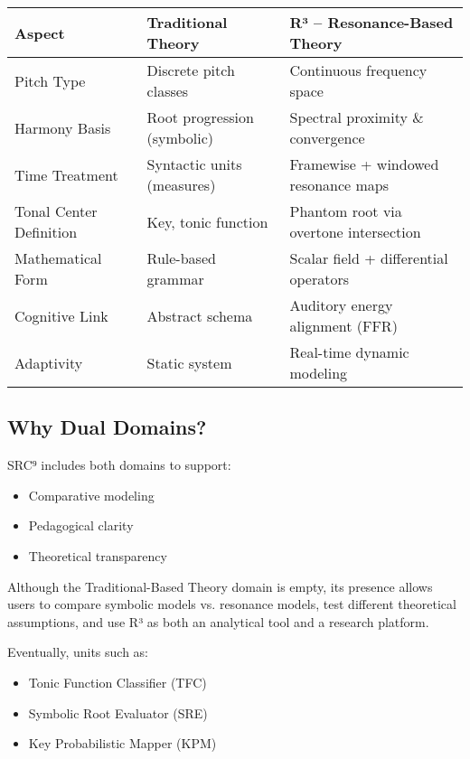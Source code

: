 \begin{center}
\begin{tabular}{|l|p{4.5cm}|p{5.5cm}|}
\hline
\textbf{Aspect} & \textbf{Traditional Theory} & \textbf{R³ – Resonance-Based Theory} \\
\hline
Pitch Type & Discrete pitch classes & Continuous frequency space \\
Harmony Basis & Root progression (symbolic) & Spectral proximity \& convergence \\
Time Treatment & Syntactic units (measures) & Framewise + windowed resonance maps \\
Tonal Center Definition & Key, tonic function & Phantom root via overtone intersection \\
Mathematical Form & Rule-based grammar & Scalar field + differential operators \\
Cognitive Link & Abstract schema & Auditory energy alignment (FFR) \\
Adaptivity & Static system & Real-time dynamic modeling \\
\hline
\end{tabular}
\end{center}

\subsection*{Why Dual Domains?}

SRC⁹ includes both domains to support:

\begin{itemize}
    \item Comparative modeling
    \item Pedagogical clarity
    \item Theoretical transparency
\end{itemize}

Although the Traditional-Based Theory domain is empty, its presence allows users to compare symbolic models vs. resonance models, test different theoretical assumptions, and use R³ as both an analytical tool and a research platform.

Eventually, units such as:

\begin{itemize}
    \item Tonic Function Classifier (TFC)
    \item Symbolic Root Evaluator (SRE)
    \item Key Probabilistic Mapper (KPM)
\end{itemize}

